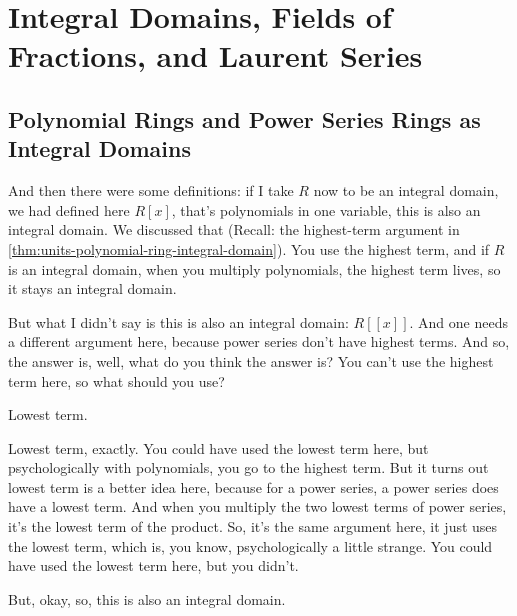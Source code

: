 \begin{hidden}
\end{hidden}

\section{Integral Domains, Fields of Fractions, and Laurent Series}

\subsection{Polynomial Rings and Power Series Rings as Integral Domains}

\begin{speech}[00:05:44 - 00:06:39]
And then there were some definitions: if I take $R$ now to be an integral domain,  we had defined here $R[x]$, that's polynomials in one variable, this is also an integral domain.  We discussed that (Recall: the highest-term argument in \cref{thm:units-polynomial-ring-integral-domain}). You use the highest term, and if $R$ is an integral domain, when you multiply polynomials, the highest term lives, so it stays an integral domain. 

But what I didn't say is this is also an integral domain: $R[[x]]$.  And one needs a different argument here, because power series don't have highest terms. And so, the answer is, well, what do you think the answer is? You can't use the highest term here, so what should you use?
\end{speech}

\begin{student}
Lowest term.
\end{student}

\begin{speech}[00:06:41 - 00:07:07]
Lowest term, exactly. You could have used the lowest term here, but psychologically with polynomials, you go to the highest term. But it turns out lowest term is a better idea here, because for a power series, a power series does have a lowest term. And when you multiply the two lowest terms of power series, it's the lowest term of the product. So, it's the same argument here, it just uses the lowest term, which is, you know, psychologically a little strange. You could have used the lowest term here, but you didn't. 

But, okay, so, this is also an integral domain.
\end{speech}

